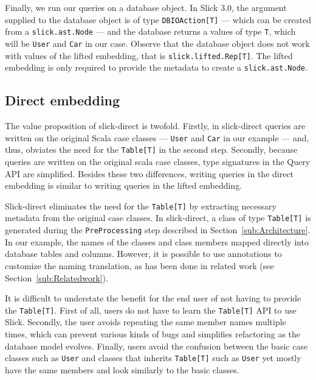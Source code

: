 Finally, we run our queries on a database object.
In Slick 3.0, the argument supplied to the database object is of type \texttt{DBIOAction[T]} --- which can be created from a \texttt{slick.ast.Node} --- and the database returns a values of type \texttt{T}, which will be \texttt{User} and \texttt{Car} in our case.
Observe that the database object does not work with values of the lifted embedding, that is \texttt{slick.lifted.Rep[T]}.
The lifted embedding is only required to provide the metadata to create a \texttt{slick.ast.Node}.

\subsection{Direct embedding} %
\label{sub:Directembedding}
The value proposition of slick-direct is twofold.
Firstly, in slick-direct queries are written on the original Scala case classes --- \texttt{User} and \texttt{Car} in our example --- and, thus, obviates the need for the \texttt{Table[T]} in the second step.
Secondly, because queries are written on the original scala case classes, type signatures in the Query API are simplified.
Besides these two differences, writing queries in the direct embedding is similar to writing queries in the lifted embedding.

Slick-direct eliminates the need for the \texttt{Table[T]} by extracting necessary metadata from the original case classes.
In slick-direct, a class of type \texttt{Table[T]} is generated during the \texttt{PreProcessing} step described in Section~\ref{sub:Architecture}.
In our example, the names of the classes and class members mapped directly into database tables and columns.
However, it is possible to use annotations to customize the naming translation, as has been done in related work (see Section~\ref{sub:Relatedwork}).

It is difficult to understate the benefit for the end user of not having to provide the \texttt{Table[T]}.
First of all, users do not have to learn the \texttt{Table[T]} API to use Slick.
Secondly, the user avoids repeating the same member names multiple times, which can prevent various kinds of bugs and simplifies refactoring as the database model evolves.
Finally, users avoid the confusion between the basic case classes such as \texttt{User} and classes that inherits \texttt{Table[T]} such as \texttt{User} yet mostly have the same members and look similarly to the basic classes.

